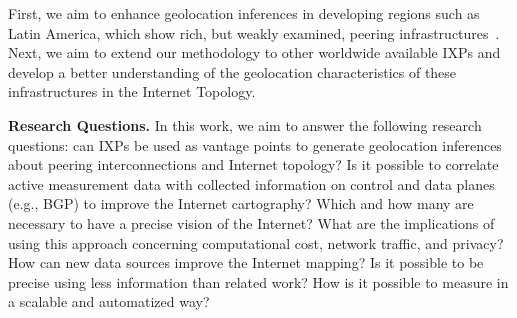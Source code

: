 	First, we aim to enhance geolocation inferences in developing regions such as Latin America, which show rich, but weakly examined, peering infrastructures~\cite{IXbr, DissectingBrazilianIXP}. Next, we aim to extend our methodology to other worldwide available IXPs and develop a better understanding of the geolocation characteristics of these infrastructures in the Internet Topology.




	\textbf{Research Questions.} In this work, we aim to answer the following research questions: can IXPs be used as vantage points to generate geolocation inferences about peering interconnections and Internet topology? Is it possible to correlate active measurement data with collected information on control and data planes (e.g., BGP) to improve the Internet cartography?  Which and how many are necessary to have a precise vision of the Internet? What are the implications of using this approach concerning computational cost, network traffic, and privacy? How can new data sources improve the Internet mapping? Is it possible to be precise using less information than related work? How is it possible to measure in a scalable and automatized way?

